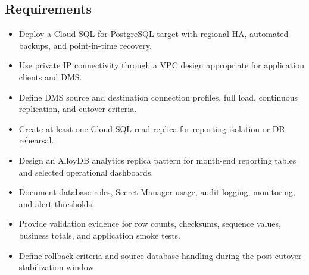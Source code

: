 \subsection*{Requirements}
\begin{itemize}
    \item Deploy a Cloud SQL for PostgreSQL target with regional HA, automated backups, and point-in-time recovery.
    \item Use private IP connectivity through a VPC design appropriate for application clients and DMS.
    \item Define DMS source and destination connection profiles, full load, continuous replication, and cutover criteria.
    \item Create at least one Cloud SQL read replica for reporting isolation or DR rehearsal.
    \item Design an AlloyDB analytics replica pattern for month-end reporting tables and selected operational dashboards.
    \item Document database roles, Secret Manager usage, audit logging, monitoring, and alert thresholds.
    \item Provide validation evidence for row counts, checksums, sequence values, business totals, and application smoke tests.
    \item Define rollback criteria and source database handling during the post-cutover stabilization window.
\end{itemize}

